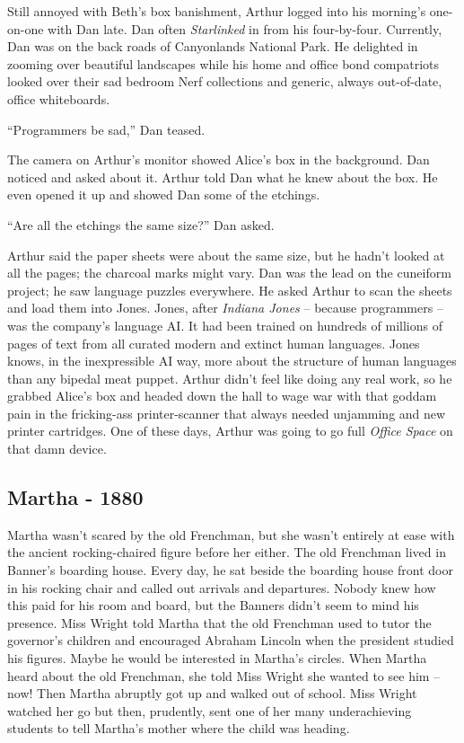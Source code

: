 Still annoyed with Beth's box banishment, Arthur logged into his
morning's one-on-one with Dan late. Dan often \emph{Starlinked} in from
his four-by-four. Currently, Dan was on the back roads of Canyonlands
National Park. He delighted in zooming over beautiful landscapes while
his home and office bond compatriots looked over their sad bedroom Nerf
collections and generic, always out-of-date, office whiteboards.

``Programmers be sad,'' Dan teased.

The camera on Arthur's monitor showed Alice's box in the background. Dan
noticed and asked about it. Arthur told Dan what he knew about the box.
He even opened it up and showed Dan some of the etchings.

``Are all the etchings the same size?'' Dan asked.

Arthur said the paper sheets were about the same size, but he hadn't
looked at all the pages; the charcoal marks might vary. Dan was the lead
on the cuneiform project; he saw language puzzles everywhere. He asked
Arthur to scan the sheets and load them into Jones. Jones, after
\emph{Indiana Jones} -- because programmers -- was the company's
language AI. It had been trained on hundreds of millions of pages of
text from all curated modern and extinct human languages. Jones knows,
in the inexpressible AI way, more about the structure of human languages
than any bipedal meat puppet. Arthur didn't feel like doing any real
work, so he grabbed Alice's box and headed down the hall to wage war
with that goddam pain in the fricking-ass printer-scanner that always
needed unjamming and new printer cartridges. One of these days, Arthur
was going to go full \emph{Office Space} on that damn device.

\hypertarget{martha---1880}{%
\subsection*{Martha - 1880}\label{martha---1880}}

Martha wasn't scared by the old Frenchman, but she wasn't entirely at
ease with the ancient rocking-chaired figure before her either. The old
Frenchman lived in Banner's boarding house. Every day, he sat beside the
boarding house front door in his rocking chair and called out arrivals
and departures. Nobody knew how this paid for his room and board, but
the Banners didn't seem to mind his presence. Miss Wright told Martha
that the old Frenchman used to tutor the governor's children and
encouraged Abraham Lincoln when the president studied his figures. Maybe
he would be interested in Martha's circles. When Martha heard about the
old Frenchman, she told Miss Wright she wanted to see him -- now! Then
Martha abruptly got up and walked out of school. Miss Wright watched her
go but then, prudently, sent one of her many underachieving students to
tell Martha's mother where the child was heading.

